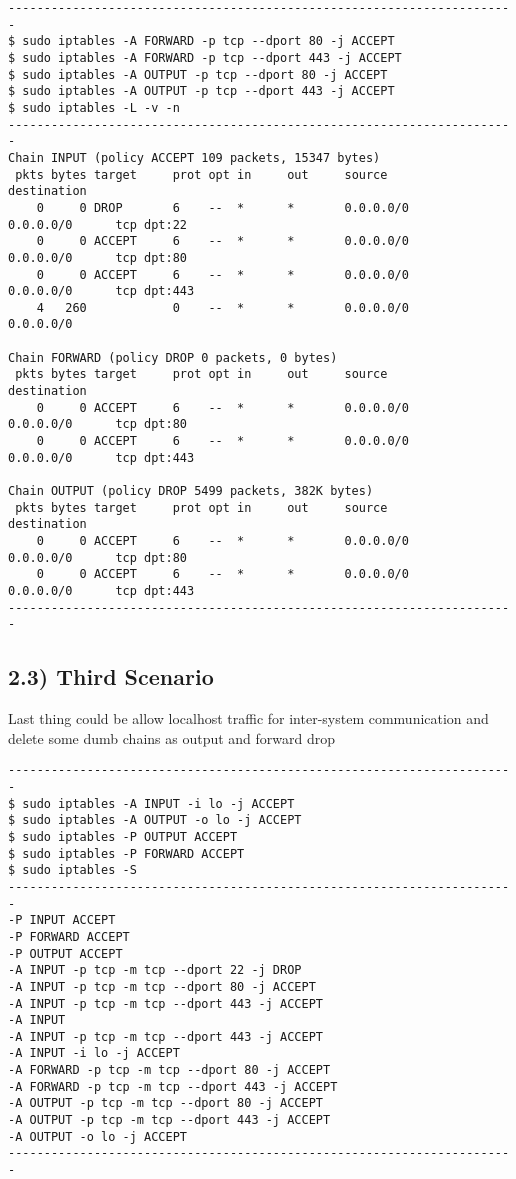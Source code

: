 \documentclass{article}
\begin{document}
\begin{verbatim}
-----------------------------------------------------------------------
$ sudo iptables -A FORWARD -p tcp --dport 80 -j ACCEPT
$ sudo iptables -A FORWARD -p tcp --dport 443 -j ACCEPT
$ sudo iptables -A OUTPUT -p tcp --dport 80 -j ACCEPT
$ sudo iptables -A OUTPUT -p tcp --dport 443 -j ACCEPT
$ sudo iptables -L -v -n
-----------------------------------------------------------------------
Chain INPUT (policy ACCEPT 109 packets, 15347 bytes)
 pkts bytes target     prot opt in     out     source         destination         
    0     0 DROP       6    --  *      *       0.0.0.0/0      0.0.0.0/0      tcp dpt:22
    0     0 ACCEPT     6    --  *      *       0.0.0.0/0      0.0.0.0/0      tcp dpt:80
    0     0 ACCEPT     6    --  *      *       0.0.0.0/0      0.0.0.0/0      tcp dpt:443
    4   260            0    --  *      *       0.0.0.0/0      0.0.0.0/0           

Chain FORWARD (policy DROP 0 packets, 0 bytes)
 pkts bytes target     prot opt in     out     source         destination         
    0     0 ACCEPT     6    --  *      *       0.0.0.0/0      0.0.0.0/0      tcp dpt:80
    0     0 ACCEPT     6    --  *      *       0.0.0.0/0      0.0.0.0/0      tcp dpt:443

Chain OUTPUT (policy DROP 5499 packets, 382K bytes)
 pkts bytes target     prot opt in     out     source         destination         
    0     0 ACCEPT     6    --  *      *       0.0.0.0/0      0.0.0.0/0      tcp dpt:80
    0     0 ACCEPT     6    --  *      *       0.0.0.0/0      0.0.0.0/0      tcp dpt:443
-----------------------------------------------------------------------
\end{verbatim}

\subsection*{2.3) Third Scenario}
Last thing could be allow localhost traffic for inter-system communication and delete some dumb chains as output and forward drop\\

\begin{verbatim}
-----------------------------------------------------------------------
$ sudo iptables -A INPUT -i lo -j ACCEPT
$ sudo iptables -A OUTPUT -o lo -j ACCEPT
$ sudo iptables -P OUTPUT ACCEPT
$ sudo iptables -P FORWARD ACCEPT
$ sudo iptables -S
-----------------------------------------------------------------------
-P INPUT ACCEPT
-P FORWARD ACCEPT
-P OUTPUT ACCEPT
-A INPUT -p tcp -m tcp --dport 22 -j DROP
-A INPUT -p tcp -m tcp --dport 80 -j ACCEPT
-A INPUT -p tcp -m tcp --dport 443 -j ACCEPT
-A INPUT
-A INPUT -p tcp -m tcp --dport 443 -j ACCEPT
-A INPUT -i lo -j ACCEPT
-A FORWARD -p tcp -m tcp --dport 80 -j ACCEPT
-A FORWARD -p tcp -m tcp --dport 443 -j ACCEPT
-A OUTPUT -p tcp -m tcp --dport 80 -j ACCEPT
-A OUTPUT -p tcp -m tcp --dport 443 -j ACCEPT
-A OUTPUT -o lo -j ACCEPT
-----------------------------------------------------------------------
\end{verbatim}
\end{document}
